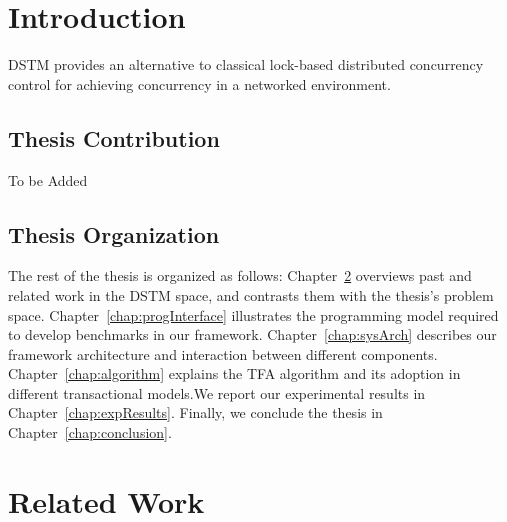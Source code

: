 \documentclass[12pt,english]{report}
\begin{document}
\chapter{Introduction}\label{chap:intro}

DSTM provides an alternative to classical lock-based distributed concurrency control for achieving concurrency in a networked environment. 

\section{Thesis Contribution}

To be Added

\section{Thesis Organization}

The rest of the thesis is organized as follows: Chapter~\ref{chap:relWork} overviews past and related work in the DSTM space, and contrasts them with the thesis's problem space. Chapter~\ref{chap:progInterface} illustrates the programming model required to develop benchmarks in our framework. Chapter~\ref{chap:sysArch} describes our framework architecture and interaction between different components. Chapter~\ref{chap:algorithm} explains the TFA algorithm and its adoption in different transactional models.We report our experimental results in Chapter~\ref{chap:expResults}. Finally, we conclude the thesis in Chapter~\ref{chap:conclusion}.

\chapter{Related Work}\label{chap:relWork}
\end{document}
